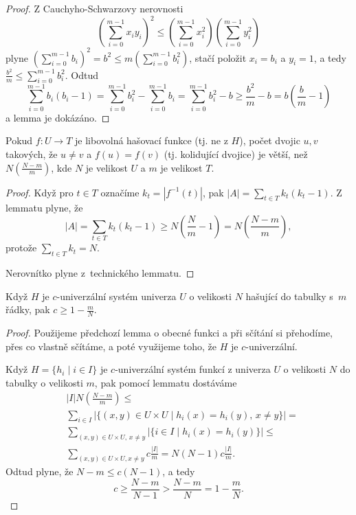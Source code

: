 \documentclass[a4paper,12pt]{article}
\begin{document}
\begin{proof}Z Cauchyho-Schwarzovy nerovnosti 
$$(\sum_{i=0}^{m-1}x_iy_i)^2\le (\sum_{i=0}^{m-1}x^2_i)(\sum_{i=0}^{
m-1}y_i^2)$$
plyne $(\sum_{i=0}^{m-1}b_i)^2=b^2\le m(\sum_{i=0}^{m-1}b_i^2)$, stačí položit 
$x_i=b_i$ a $y_i=1$, a tedy $\frac {b^2}m\le\sum_{i=0}^{m-1}b_i^2$. Odtud
$$\sum_{i=0}^{m-1}b_i(b_i-1)=\sum_{i=0}^{m-1}b_i^2-\sum_{i=0}^{m-
1}b_i=\sum_{i=0}^{m-1}b_i^2-b\ge\frac {b^2}m-b=b(\frac bm-1)$$
a lemma je dokázáno.
\end{proof}

\begin{lemma}
    Pokud $f:U\to T$ je libovolná hašovací funkce (tj. ne z $H$), počet dvojic $u,v$ takových, že $u\ne v$ a $
    f(u)=f(v)$ (tj. kolidující dvojice) je větší, než $N(\frac {N-m}m)$, kde $N$ je velikost $U$ a $m$ je velikost $T$.
\end{lemma}
\begin{proof}
    Když pro $t\in T$ označíme $k_t=|f^{-1}(t)|$, pak $|A|=
    \sum_{t\in T}k_t(k_t-1)$.
    Z lemmatu plyne, že 
    $$|A|=\sum_{t\in T}k_t(k_t-1)\ge N(\frac Nm-1)=N(\frac {N-m}m),$$
    protože $\sum_{t\in T}k_t=N$.
    
    Nerovnítko plyne z~technického lemmatu.
\end{proof}

\begin{veta}Když $H$ je $c$-univerzální 
systém univerza $U$ o velikosti $N$ hašující do tabulky s~$
m$ řádky, 
pak $c\ge 1-\frac mN$.
\end{veta}


\begin{proof}

Použijeme předchozí lemma o obecné funkci a při sčítání si  přehodíme, přes co vlastně sčítáme, a poté využijeme toho, že $H$ je $c$-univerzální.

Když $H=\{h_i\mid i\in I\}$ je $c$-univerzální systém funkcí z univerza $
U$ o 
velikosti $N$ do tabulky o velikosti $m$, pak pomocí 
lemmatu dostáváme 
\begin{align*}&|I|N(\frac {N-m}m)\le\\
&\sum_{i\in I}|\{(x,y)\in U\times U\mid h_i(x)=h_i(y),\,x\ne y\}|
=\\
&\sum_{(x,y)\in U\times U,\,x\ne y}|\{i\in I\mid h_i(x)=h_i(y)\}|
\le\\
&\sum_{(x,y)\in U\times U,x\ne y}c\frac {|I|}m=N(N-1)c\frac {|I|}
m.\end{align*}
Odtud plyne, že $N-m\le c(N-1)$, a tedy 
$$c\ge\frac {N-m}{N-1}>\frac {N-m}N=1-\frac mN.$$
\end{proof}
\end{document}
